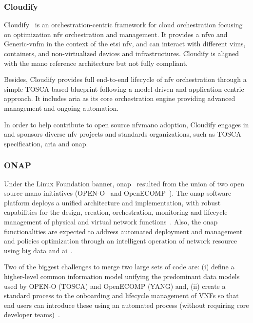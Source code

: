 \subsubsection{Cloudify}
Cloudify~\cite{GigaSpaces2015} is an orchestration-centric framework for cloud orchestration focusing on optimization \gls{nfv} orchestration and management. It provides a \gls{nfvo} and Generic-\gls{vnfm} in the context of the \gls{etsi} \gls{nfv}, and can interact with different \glspl{vim}, containers, and non-virtualized devices and infrastructures. Cloudify is aligned with the \gls{mano} reference architecture but not fully compliant. 

Besides, Cloudify provides full end-to-end lifecycle of \gls{nfv} orchestration through a simple TOSCA-based blueprint following a model-driven and application-centric approach. It includes \gls{aria} as its core orchestration engine providing advanced management and ongoing automation.

In order to help contribute to open source \gls{nfvmano} adoption, Cloudify engages in and sponsors diverse \gls{nfv} projects and standards organizations, such as TOSCA specification, \gls{aria} and \gls{onap}.

\subsubsection{ONAP}
Under the Linux Foundation banner, \acrfull{onap}~\cite{onap} resulted from the union of two open source \gls{mano} initiatives (OPEN-O~\cite{Foundation} and OpenECOMP~\cite{ATT2016ECOMPPaper}). The \gls{onap} software platform deploys a unified architecture and implementation, with robust capabilities for the design, creation, orchestration, monitoring and lifecycle management of physical and virtual network functions~\cite{onapwiki}. Also, the \gls{onap} functionalities are expected to address automated deployment and management and policies optimization through an intelligent operation of network resource using big data and \gls{ai}~\cite{onapconvergedigest}.

Two of the biggest challenges to merge two large sets of code are: (i) define a higher-level common information model unifying the predominant data models used by OPEN-O (TOSCA) and OpenECOMP (YANG) and, (ii) create a standard process to the onboarding and lifecycle management of VNFs so that end users can introduce these using an automated process (without requiring core developer teams)~\cite{onaplightreading}.

